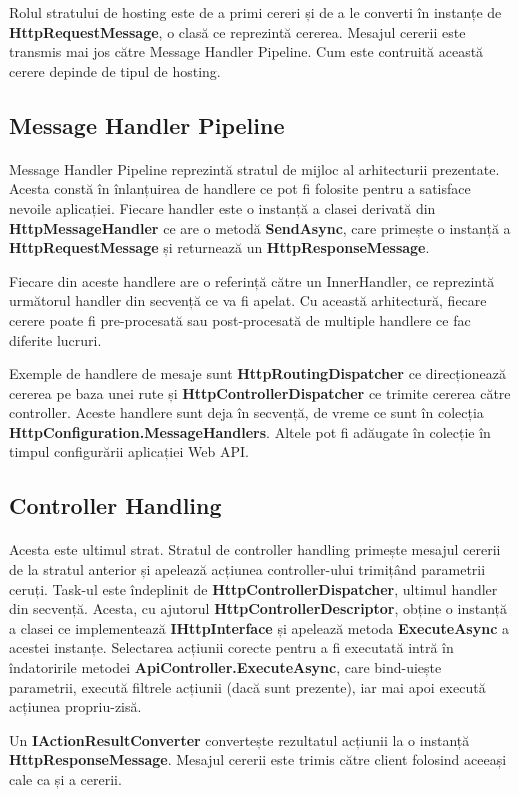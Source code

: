 Rolul stratului de hosting este de a primi cereri și de a le converti în instanțe de \textbf{HttpRequestMessage}, o clasă ce reprezintă cererea. Mesajul cererii este transmis mai jos către Message Handler Pipeline. Cum este contruită această cerere depinde de tipul de hosting.

\subsection{Message Handler Pipeline}
\paragraph{} Message Handler Pipeline reprezintă stratul de mijloc al arhitecturii prezentate. Acesta constă în înlanțuirea  de handlere ce pot fi folosite pentru a satisface nevoile aplicației. Fiecare handler este o instanță a clasei derivată din \textbf{HttpMessageHandler} ce are o metodă \textbf{SendAsync}, care primește o instanță a \textbf{HttpRequestMessage} și returnează un \textbf{HttpResponseMessage}.\cite{19}

Fiecare din aceste handlere are o referință către un InnerHandler, ce reprezintă următorul handler din secvență ce va fi apelat.
Cu această arhitectură, fiecare cerere poate fi pre-procesată sau post-procesată de multiple handlere ce fac diferite lucruri.

Exemple de handlere de mesaje sunt \textbf{HttpRoutingDispatcher} ce direcționează cererea pe baza unei rute și \textbf{HttpControllerDispatcher} ce trimite cererea către controller.
Aceste handlere sunt deja în secvență, de vreme ce sunt în colecția \textbf{HttpConfiguration.MessageHandlers}. Altele pot fi adăugate în colecție în timpul configurării aplicației Web API.

\subsection{Controller Handling}
\paragraph{} Acesta este ultimul strat. Stratul de controller handling primește mesajul cererii de la stratul anterior și apelează acțiunea controller-ului trimițând parametrii ceruți. Task-ul este îndeplinit de \textbf{HttpControllerDispatcher}, ultimul handler din secvență. Acesta, cu ajutorul \textbf{HttpControllerDescriptor}, obține o instanță a clasei ce implementează \textbf{IHttpInterface} și apelează metoda \textbf{ExecuteAsync} a acestei instanțe. Selectarea acțiunii corecte pentru a fi executată intră în îndatoririle metodei \textbf{ApiController.ExecuteAsync}, care bind-uiește parametrii, execută filtrele acțiunii (dacă sunt prezente), iar mai apoi execută acțiunea propriu-zisă.\cite{19}

Un \textbf{IActionResultConverter} convertește rezultatul acțiunii la o instanță \textbf{HttpResponseMessage}. Mesajul cererii este trimis către client folosind aceeași cale ca și a cererii.


